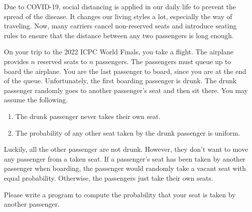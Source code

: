 Due to COVID-19, social distancing is applied in our daily life to prevent
the spread of the disease. It changes our living styles a lot, especially 
the way of traveling. 
Now, many carriers cancel non-reserved seats and introduce seating rules 
to ensure that the distance between any two passengers is long enough.

On your trip to the 2022 ICPC World Finals, you take a flight.
The airplane provides $n$ reserved seats to $n$ passengers.
The passengers must queue up to board the airplane.
You are the last passenger to board, since you are at the end
of the queue.
Unfortunately, the first boarding passenger is drunk.
The drunk passenger randomly goes to another passenger's seat 
and then sit there.
You may assume the following.
\begin{enumerate}
\item The drunk passenger never takes their own seat.
\item The probability of any other seat taken by the drunk passenger is uniform.
\end{enumerate}

Luckily, all the other passenger are not drunk. However, they don't want 
to move any passenger from a taken seat. If a passenger's seat has been taken 
by another passenger when boarding, the passenger would randomly take a 
vacant seat with equal probability. 
Otherwise, the passengers just take their own seats.

Please write a program to compute the probability that your seat is taken
by another passenger.
